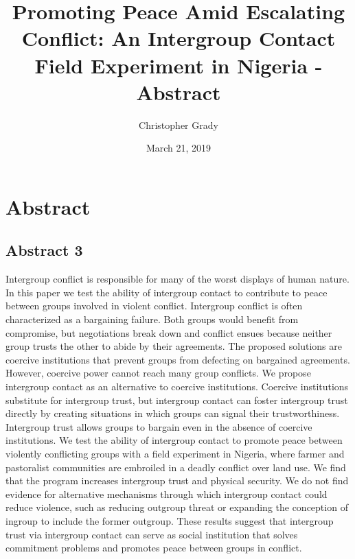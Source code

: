 \documentclass[]{article}
\title{Promoting Peace Amid Escalating Conflict: An Intergroup Contact Field
Experiment in Nigeria - Abstract}
\author{Christopher Grady}
\date{March 21, 2019}
\begin{document}
\maketitle

\section{Abstract}\label{abstract}

\subsection{Abstract 3}\label{abstract-3}

Intergroup conflict is responsible for many of the worst displays of
human nature. In this paper we test the ability of intergroup contact to
contribute to peace between groups involved in violent conflict.
Intergroup conflict is often characterized as a bargaining failure. Both
groups would benefit from compromise, but negotiations break down and
conflict ensues because neither group trusts the other to abide by their
agreements. The proposed solutions are coercive institutions that
prevent groups from defecting on bargained agreements. However, coercive
power cannot reach many group conflicts. We propose intergroup contact
as an alternative to coercive institutions. Coercive institutions
substitute for intergroup trust, but intergroup contact can foster
intergroup trust directly by creating situations in which groups can
signal their trustworthiness. Intergroup trust allows groups to bargain
even in the absence of coercive institutions. We test the ability of
intergroup contact to promote peace between violently conflicting groups
with a field experiment in Nigeria, where farmer and pastoralist
communities are embroiled in a deadly conflict over land use. We find
that the program increases intergroup trust and physical security. We do
not find evidence for alternative mechanisms through which intergroup
contact could reduce violence, such as reducing outgroup threat or
expanding the conception of ingroup to include the former outgroup.
These results suggest that intergroup trust via intergroup contact can
serve as social institution that solves commitment problems and promotes
peace between groups in conflict.
\end{document}
